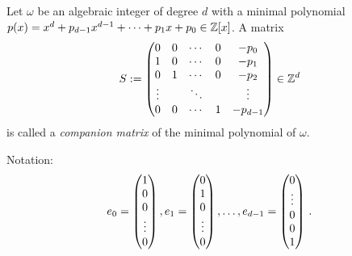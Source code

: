 \begin{defn}
Let $\omega$ be an algebraic integer of degree $d$ with a minimal polynomial $p(x)=x^d +p_{d-1}x^{d-1}+ \cdots + p_1 x+p_0 \in \mathbb{Z}[x]$. A matrix 
$$
S := \begin{pmatrix}
            0 & 0 & \cdots & 0 & -p_0 \\
            1 & 0 & \cdots & 0 & -p_1 \\
            0 & 1 & \cdots & 0 & -p_2 \\
            \vdots &   & \ddots & & \vdots \\
            0 & 0 & \cdots & 1 & -p_{d-1} 
            \end{pmatrix} \in \mathbb{Z}^d
$$
is called a \emph{companion matrix} of the minimal polynomial of $\omega$.
\end{defn}

Notation:
$$
e_0=\begin{pmatrix}
              1 \\
              0 \\
              0 \\
              \vdots \\
              0
              \end{pmatrix}, \\
e_1=\begin{pmatrix}
              0 \\
              1 \\
              0 \\
              \vdots \\
              0
              \end{pmatrix}, \dots ,\\
e_{d-1}=\begin{pmatrix}
              0 \\        
              \vdots \\
              0 \\
              0\\
              1
              \end{pmatrix}\,.             
$$


